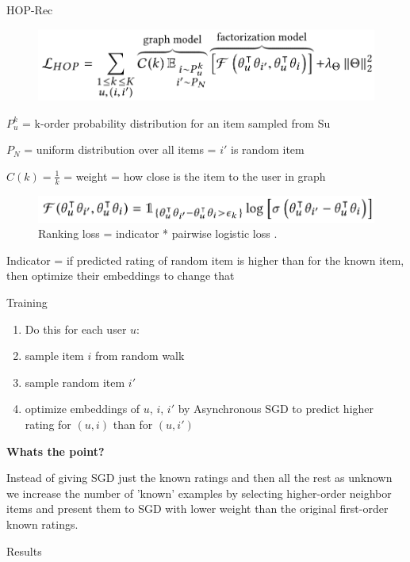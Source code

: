 \documentclass{beamer}
\begin{document}
\begin{frame}{HOP-Rec}

\begin{figure}[h]
\includegraphics[scale=0.60]{img/loss}
\end{figure}

$P_u^k$ = k-order probability distribution for an
item sampled from Su

$P_N$ = uniform distribution over all items = $i'$ is random item

$C(k) = \frac{1}{k}$ = weight = how close is the item to the user in graph

\begin{figure}[h]
\includegraphics[scale=0.60]{img/log-loss}
\caption{Ranking loss = indicator * pairwise logistic loss \cite{cit:hop-rec}.}
\end{figure}

Indicator = if predicted rating of random item is higher than for the known item, then optimize their embeddings to change that

\end{frame}
\begin{frame}{Training}

\begin{enumerate}
\item Do this for each user $u$:
\item sample item $i$ from random walk
\item sample random item $i'$
\item optimize embeddings of $u$, $i$, $i'$ by Asynchronous SGD to predict higher rating for $(u,i)$ than for $(u,i')$ 
\end{enumerate}
\vfill
\textbf{Whats the point?}

Instead of giving SGD just the known ratings and then all the rest as unknown we increase the number of 'known' examples by selecting higher-order neighbor items and present them to SGD with lower weight than the original first-order known ratings.

\end{frame}
\begin{frame}{Results}

\end{frame}
\end{document}
